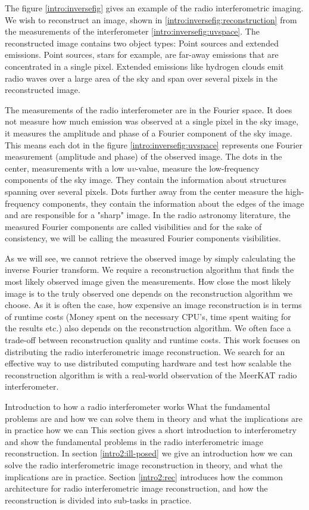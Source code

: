 The figure \ref{intro:inversefig} gives an example of the radio interferometric imaging. We wish to reconstruct an image, shown in \ref{intro:inversefig:reconstruction} from the measurements of the interferometer \ref{intro:inversefig:uvspace}. The reconstructed image contains two object types: Point sources and extended emissions. Point sources, stars for example, are far-away emissions that are concentrated in a single pixel. Extended emissions like hydrogen clouds emit radio waves over a large area of the sky and span over several pixels in the reconstructed image.

The measurements of the radio interferometer are in the Fourier space. It does not measure how much emission was observed at a single pixel in the sky image, it measures the amplitude and phase of a Fourier component of the sky image. This means each dot in the figure \ref{intro:inversefig:uvspace} represents one Fourier measurement (amplitude and phase) of the observed image. The dots in the center, measurements with a low $uv$-value, measure the low-frequency components of the sky image. They contain the information about structures spanning over several pixels. Dots further away from the center measure the high-frequency components, they contain the information about the edges of the image and are responsible for a "sharp" image. In the radio astronomy literature, the measured Fourier components are called visibilities and for the sake of consistency, we will be calling the measured Fourier components visibilities.

As we will see, we cannot retrieve the observed image by simply calculating the inverse Fourier transform. We require a reconstruction algorithm that finds the most likely observed image given the measurements. How close the most likely image is to the truly observed one depends on the reconstruction algorithm we choose. As it is often the case, how expensive an image reconstruction is in terms of runtime costs (Money spent on the necessary CPU's, time spent waiting for the results etc.) also depends on the reconstruction algorithm. We often face a trade-off between reconstruction quality and runtime costs. This work focuses on distributing the radio interferometric image reconstruction. We search for an effective way to use distributed computing hardware and test how scalable the reconstruction algorithm is with a real-world observation of the MeerKAT radio interferometer.

Introduction to how a radio interferometer works
What the fundamental problems are and how we can solve them in theory and what the implications are in practice
how we can 
This section gives a short introduction to interferometry and show the fundamental problems in the radio interferometric image reconstruction. In section \ref{intro2:ill-posed} we give an introduction how we can solve the radio interferometric image reconstruction in theory, and what the implications are in practice. Section \ref{intro2:rec} introduces how the common architecture for radio interferometric image reconstruction, and how the reconstruction is divided into sub-tasks in practice. 

